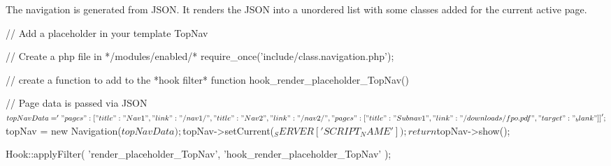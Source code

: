 The navigation is generated from J\-S\-O\-N. It renders the J\-S\-O\-N into a unordered list with some classes added for the current active page. \begin{DoxyVerb}           // Add a placeholder in your template
           {{ TopNav }}

           // Create a php file in */modules/enabled/*
           require_once('include/class.navigation.php');

           // create a function to add to the *hook filter*
           function hook_render_placeholder_TopNav() {

                          // Page data is passed via JSON
                          $topNavData = '{
                                         "pages": [
                                                        {
                                                                       "title": "Nav 1",
                                                                       "link": "/nav1/"
                                                        }, {
                                                                       "title": "Nav 2",
                                                                       "link": "/nav2/",
                                                                       "pages": [
                                                                                      {
                                                                                                     "title": "Subnav 1",
                                                                                                     "link": "/downloads/fpo.pdf",
                                                                                                     "target": "_blank"
                                                                                      }
                                                                       ]
                                                        }
                                         ]
                          }';

                          $topNav = new Navigation($topNavData);
                          $topNav->setCurrent($_SERVER['SCRIPT_NAME']);

                          return $topNav->show();
           }

           Hook::applyFilter(
                          'render_placeholder_TopNav',
                          'hook_render_placeholder_TopNav'
           );\end{DoxyVerb}
 